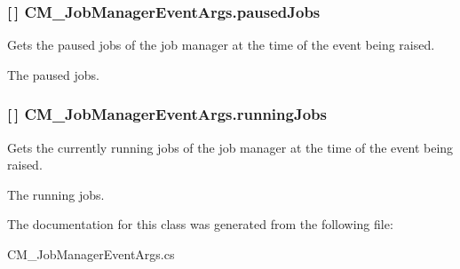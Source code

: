 \subsubsection[{paused\+Jobs}]{ \mbox{[}$\,$\mbox{]} C\+M\+\_\+\+Job\+Manager\+Event\+Args.\+paused\+Jobs\hspace{0.3cm}{\ttfamily [get]}}\label{class_c_m___job_manager_event_args_a655cd7e19559fa5cad8a10c8a4c40992}


Gets the paused jobs of the job manager at the time of the event being raised. 

The paused jobs.\hypertarget{class_c_m___job_manager_event_args_a354cda77d3151fa14c5a862de00c6fda}{}
\subsubsection[{running\+Jobs}]{ \mbox{[}$\,$\mbox{]} C\+M\+\_\+\+Job\+Manager\+Event\+Args.\+running\+Jobs\hspace{0.3cm}{\ttfamily [get]}}\label{class_c_m___job_manager_event_args_a354cda77d3151fa14c5a862de00c6fda}


Gets the currently running jobs of the job manager at the time of the event being raised. 

The running jobs.

The documentation for this class was generated from the following file\+:\begin{DoxyCompactItemize}
\item 
C\+M\+\_\+\+Job\+Manager\+Event\+Args.\+cs\end{DoxyCompactItemize}
